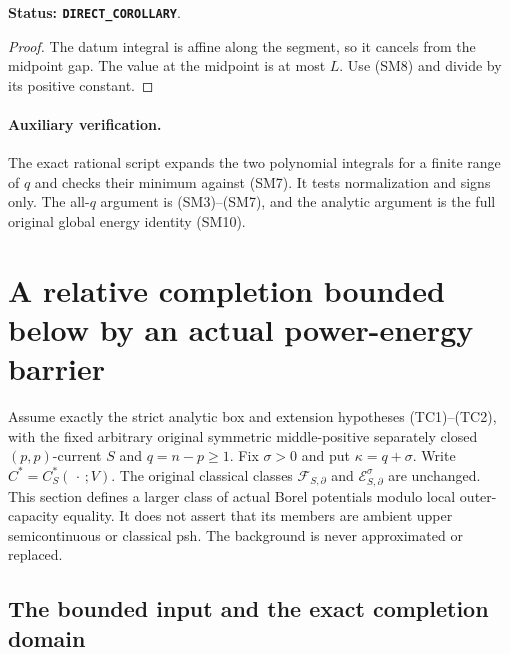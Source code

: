 \documentclass[11pt,a4paper]{article}
\numberwithin{equation}{section}
\theoremstyle{definition}
\theoremstyle{remark}
\begin{document}
\noindent\textbf{Status: \texttt{DIRECT\_COROLLARY}}.

\begin{proof}
The datum integral is affine along the segment,
so it cancels from the midpoint gap.
The value at the midpoint is at most $L$.
Use (SM8) and divide by its positive constant.
\end{proof}

\paragraph{Auxiliary verification.}
The exact rational script
expands the two polynomial integrals for a finite
range of $q$ and checks their minimum against (SM7).
It tests normalization and signs only.
The all-$q$ argument is (SM3)--(SM7), and the analytic
argument is the full original global energy identity
(SM10).



\section{A relative completion bounded below by an actual power-energy barrier}
\label{sec:r11-barrier-relative-completion}

Assume exactly the strict analytic box and extension hypotheses
(TC1)--(TC2), with the fixed arbitrary original symmetric
middle-positive separately closed $(p,p)$-current $S$ and
$q=n-p\geq1$. Fix $\sigma>0$ and put $\kappa=q+\sigma$.
Write $C^*=C_S^*(\,\cdot\,;V)$. The original classical
classes $\mathcal F_{S,\partial}$ and
$\mathcal E^\sigma_{S,\partial}$ are unchanged.
This section defines a larger class of actual Borel potentials
modulo local outer-capacity equality. It does not assert that
its members are ambient upper semicontinuous or classical psh.
The background is never approximated or replaced.

\subsection{The bounded input and the exact completion domain}
\end{document}
